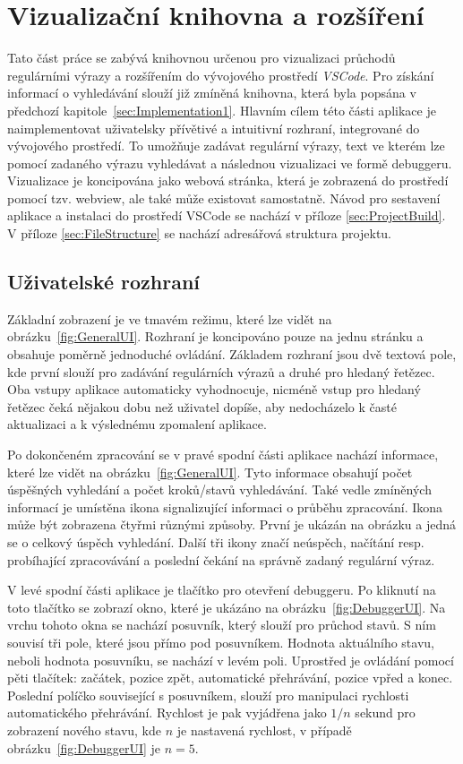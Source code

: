 \chapter{Vizualizační knihovna a rozšíření}\label{sec:Implementation2}

Tato část práce se zabývá knihovnou určenou pro vizualizaci průchodů regulárními výrazy a rozšířením do vývojového prostředí \textit{VSCode}.
Pro získání informací o vyhledávání slouží již zmíněná knihovna, která byla popsána v předchozí kapitole~\ref{sec:Implementation1}.
Hlavním cílem této části aplikace je naimplementovat uživatelsky přívětivé a intuitivní rozhraní, integrované do vývojového prostředí.
To umožňuje zadávat regulární výrazy, text ve kterém lze pomocí zadaného výrazu vyhledávat a následnou vizualizaci ve formě debuggeru.
Vizualizace je koncipována jako webová stránka, která je zobrazená do prostředí pomocí tzv. webview, ale také může existovat samostatně.
Návod pro sestavení aplikace a instalaci do prostředí VSCode se nachází v příloze \ref{sec:ProjectBuild}. 
V příloze \ref{sec:FileStructure} se nachází adresářová struktura projektu.

\section{Uživatelské rozhraní}

Základní zobrazení je ve tmavém režimu, které lze vidět na obrázku~\ref{fig:GeneralUI}.
Rozhraní je koncipováno pouze na jednu stránku a obsahuje poměrně jednoduché ovládání.
Základem rozhraní jsou dvě textová pole, kde první slouží pro zadávání regulárních výrazů a druhé pro hledaný řetězec.
Oba vstupy aplikace automaticky vyhodnocuje, nicméně vstup pro hledaný řetězec čeká nějakou dobu než uživatel dopíše, aby nedocházelo k časté aktualizaci a k výslednému zpomalení aplikace.

Po dokončeném zpracování se v pravé spodní části aplikace nachází informace, které lze vidět na obrázku~\ref{fig:GeneralUI}.
Tyto informace obsahují počet úspěšných vyhledání a počet kroků/stavů vyhledávání.
Také vedle zmíněných informací je umístěna ikona signalizující informaci o průběhu zpracování.
Ikona může být zobrazena čtyřmi různými způsoby.
První je ukázán na obrázku a jedná se o celkový úspěch vyhledání.
Další tři ikony značí neúspěch, načítání resp. probíhající zpracovávání a poslední čekání na správně zadaný regulární výraz.

V levé spodní části aplikace je tlačítko pro otevření debuggeru. 
Po kliknutí na toto tlačítko se zobrazí okno, které je ukázáno na obrázku~\ref{fig:DebuggerUI}.
Na vrchu tohoto okna se nachází posuvník, který slouží pro průchod stavů.
S ním souvisí tři pole, které jsou přímo pod posuvníkem.
Hodnota aktuálního stavu, neboli hodnota posuvníku, se nachází v levém poli.
Uprostřed je ovládání pomocí pěti tlačítek: začátek, pozice zpět, automatické přehrávání, pozice vpřed a konec.
Poslední políčko související s posuvníkem, slouží pro manipulaci rychlosti automatického přehrávání.
Rychlost je pak vyjádřena jako $1/n$ sekund pro zobrazení nového stavu, kde $n$ je nastavená rychlost, v případě obrázku~\ref{fig:DebuggerUI} je $n = 5$.

